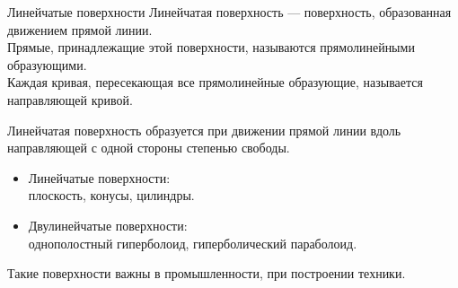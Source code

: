 \documentclass{beamer}
\begin{document}
	\begin{frame}{Линейчатые поверхности}
		Линейчатая поверхность --- поверхность, образованная движением прямой линии.
		\\ Прямые, принадлежащие этой поверхности, называются прямолинейными образующими.  \\
		Каждая кривая, пересекающая все прямолинейные образующие, называется направляющей кривой.

		Линейчатая поверхность образуется при движении прямой линии вдоль направляющей с одной стороны степенью свободы.
		\begin{itemize}
			\item 
			Линейчатые поверхности: \\
			плоскость, конусы, цилиндры.
			\item
			Двулинейчатые поверхности: \\
			однополостный гиперболоид, гиперболический параболоид.
		\end{itemize}




			Такие поверхности важны в промышленности, при построении техники.


		\end{frame}
\end{document}
